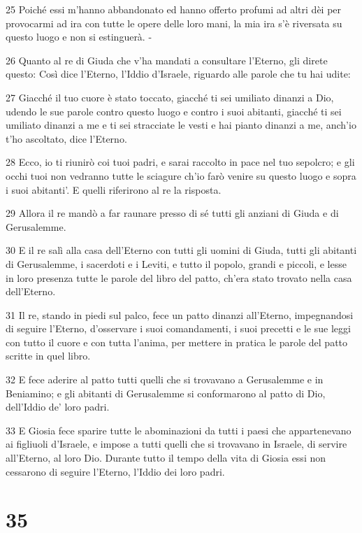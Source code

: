\par 25 Poiché essi m'hanno abbandonato ed hanno offerto profumi ad altri dèi per provocarmi ad ira con tutte le opere delle loro mani, la mia ira s'è riversata su questo luogo e non si estinguerà. -
\par 26 Quanto al re di Giuda che v'ha mandati a consultare l'Eterno, gli direte questo: Così dice l'Eterno, l'Iddio d'Israele, riguardo alle parole che tu hai udite:
\par 27 Giacché il tuo cuore è stato toccato, giacché ti sei umiliato dinanzi a Dio, udendo le sue parole contro questo luogo e contro i suoi abitanti, giacché ti sei umiliato dinanzi a me e ti sei stracciate le vesti e hai pianto dinanzi a me, anch'io t'ho ascoltato, dice l'Eterno.
\par 28 Ecco, io ti riunirò coi tuoi padri, e sarai raccolto in pace nel tuo sepolcro; e gli occhi tuoi non vedranno tutte le sciagure ch'io farò venire su questo luogo e sopra i suoi abitanti'. E quelli riferirono al re la risposta.
\par 29 Allora il re mandò a far raunare presso di sé tutti gli anziani di Giuda e di Gerusalemme.
\par 30 E il re salì alla casa dell'Eterno con tutti gli uomini di Giuda, tutti gli abitanti di Gerusalemme, i sacerdoti e i Leviti, e tutto il popolo, grandi e piccoli, e lesse in loro presenza tutte le parole del libro del patto, ch'era stato trovato nella casa dell'Eterno.
\par 31 Il re, stando in piedi sul palco, fece un patto dinanzi all'Eterno, impegnandosi di seguire l'Eterno, d'osservare i suoi comandamenti, i suoi precetti e le sue leggi con tutto il cuore e con tutta l'anima, per mettere in pratica le parole del patto scritte in quel libro.
\par 32 E fece aderire al patto tutti quelli che si trovavano a Gerusalemme e in Beniamino; e gli abitanti di Gerusalemme si conformarono al patto di Dio, dell'Iddio de' loro padri.
\par 33 E Giosia fece sparire tutte le abominazioni da tutti i paesi che appartenevano ai figliuoli d'Israele, e impose a tutti quelli che si trovavano in Israele, di servire all'Eterno, al loro Dio. Durante tutto il tempo della vita di Giosia essi non cessarono di seguire l'Eterno, l'Iddio dei loro padri.

\chapter{35}

